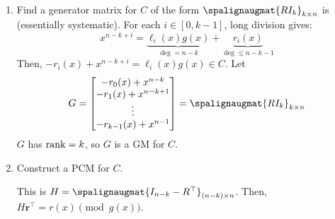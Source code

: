 \begin{enumerate}[label=(\roman*)]
    \item Find a generator matrix for $ C $ of the form
          $\spalignaugmat{R I_k}_{k\times n}$ is (essentially systematic).
          For each $ i\in [0,k-1] $, long division gives:
          \[ x^{n-k+i}=
              \underbrace{\ell_i(x)g(x)}_{\deg=n-k}+\underbrace{r_i(x)}_{\deg\leqslant n-k-1} \]
          Then, $ -r_i(x)+x^{n-k+i}=\ell_i(x)g(x)\in C $.
          Let
          \[ G=
              \begin{bmatrix}
                  -r_0(x)+x^{n-k}   \\
                  -r_1(x)+x^{n-k+1} \\
                  \vdots            \\
                  -r_{k-1}(x)+x^{n-1}
              \end{bmatrix}=\spalignaugmat{R I_k}_{k\times n}\]
          $ G $ has $ \operatorname{rank}=k $, so $ G $ is a GM for $ C $.

    \item Construct a PCM for $ C $.

          This is $ H=\spalignaugmat{I_{n-k} -R^{\top}}_{(n-k)\times n} $.
          Then, $ H\symbf{r}^\top=r(x)\pmod{g(x)} $.
\end{enumerate}
